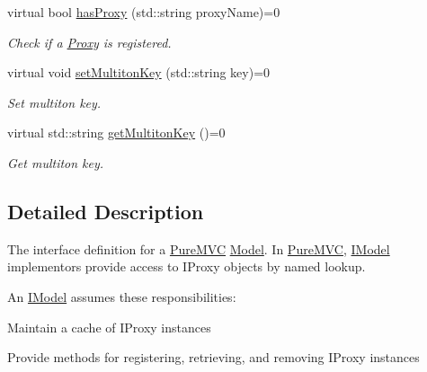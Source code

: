 \begin{DoxyCompactItemize}
virtual bool \hyperlink{class_pure_m_v_c_1_1_i_model_acb4d2a8493d547e597a3a3cfbbb7903b}{hasProxy} (std::string proxyName)=0
\begin{DoxyCompactList}\small\item\em Check if a \hyperlink{class_pure_m_v_c_1_1_proxy}{Proxy} is registered. \item\end{DoxyCompactList}\item 
virtual void \hyperlink{class_pure_m_v_c_1_1_i_multiton_key_heir_a03acb75ab79defba2c28b8de1bbe1ca6}{setMultitonKey} (std::string key)=0
\begin{DoxyCompactList}\small\item\em Set multiton key. \item\end{DoxyCompactList}\item 
virtual std::string \hyperlink{class_pure_m_v_c_1_1_i_multiton_key_heir_aecccfb9898368c6377550ceae5730934}{getMultitonKey} ()=0
\begin{DoxyCompactList}\small\item\em Get multiton key. \item\end{DoxyCompactList}\end{DoxyCompactItemize}


\subsection{Detailed Description}
The interface definition for a \hyperlink{namespace_pure_m_v_c}{PureMVC} \hyperlink{class_pure_m_v_c_1_1_model}{Model}. In \hyperlink{namespace_pure_m_v_c}{PureMVC}, {\ttfamily \hyperlink{class_pure_m_v_c_1_1_i_model}{IModel}} implementors provide access to {\ttfamily IProxy} objects by named lookup. 

An {\ttfamily \hyperlink{class_pure_m_v_c_1_1_i_model}{IModel}} assumes these responsibilities:


\begin{DoxyItemize}
\item Maintain a cache of {\ttfamily IProxy} instances 
\item Provide methods for registering, retrieving, and removing {\ttfamily IProxy} instances 
\end{DoxyItemize}

